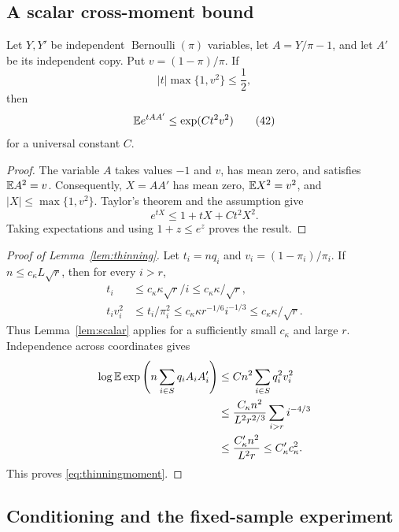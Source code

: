 \subsection{A scalar cross-moment bound}

\begin{lemma}
\label{lem:scalar}
Let $Y,Y'$ be independent $\operatorname{Bernoulli}(\pi)$ variables,
let $A=Y/\pi-1$, and let $A'$ be its independent copy. Put
$v=(1-\pi)/\pi$. If
\[
 |t|\max\{1,v^2\}\leq\frac12,
\]
then
\[
 \mathbb E e^{tAA'}\leq\exp(Ct^2v^2)                           \tag{42}\label{eq:scalarbound}
\]
for a universal constant $C$.
\end{lemma}

\begin{proof}
The variable $A$ takes values $-1$ and $v$, has mean zero, and satisfies
$\mathbb E A^2=v$. Consequently, $X=AA'$ has mean zero,
$\mathbb E X^2=v^2$, and $|X|\leq\max\{1,v^2\}$. Taylor's theorem and the
assumption give
\[
 e^{tX}\leq1+tX+C t^2X^2.
\]
Taking expectations and using $1+z\leq e^z$ proves the result.
\end{proof}

\begin{proof}[Proof of Lemma~\ref{lem:thinning}]
Let $t_i=nq_i$ and $v_i=(1-\pi_i)/\pi_i$. If
$n\leq c_\kappa L\sqrt r$, then for every $i>r$,
\begin{align*}
 t_i&\leq c_\kappa\kappa\sqrt r/i
       \leq c_\kappa\kappa/\sqrt r,\\
 t_iv_i^2&\leq t_i/\pi_i^2
 \leq c_\kappa\kappa r^{-1/6}i^{-1/3}
       \leq c_\kappa\kappa/\sqrt r.
\end{align*}
Thus Lemma~\ref{lem:scalar} applies for a sufficiently small
$c_\kappa$ and large $r$. Independence across coordinates gives
\begin{align*}
 \log\mathbb E\exp\left(n\sum_{i\in S}q_iA_iA_i'\right)
 &\leq Cn^2\sum_{i\in S}q_i^2v_i^2\\
 &\leq\frac{C_\kappa n^2}{L^2r^{2/3}}
       \sum_{i>r}i^{-4/3}\\
 &\leq\frac{C_\kappa'n^2}{L^2r}
 \leq C_\kappa'c_\kappa^2.
\end{align*}
This proves \eqref{eq:thinningmoment}.
\end{proof}

\subsection{Conditioning and the fixed-sample experiment}


